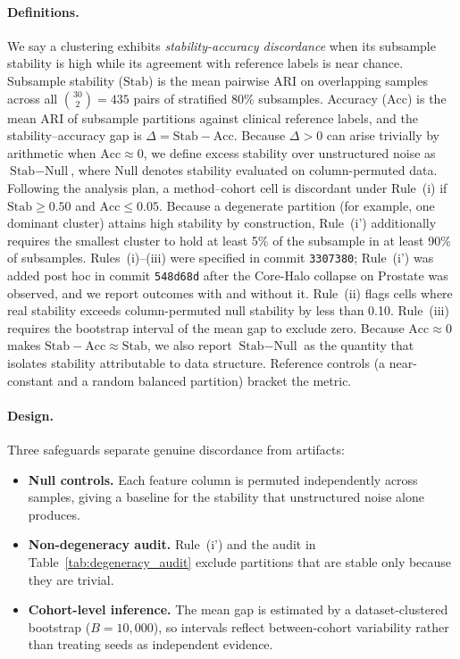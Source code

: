 \documentclass[pdflatex,sn-mathphys-num]{sn-jnl}
\theoremstyle{thmstyleone}
\theoremstyle{thmstyletwo}
\theoremstyle{thmstylethree}
\begin{document}
\paragraph{Definitions.}
We say a clustering exhibits \emph{stability-accuracy discordance} when its subsample stability is high while its agreement with reference labels is near chance. Subsample stability ($\text{Stab}$) is the mean pairwise ARI on overlapping samples across all $\binom{30}{2} = 435$ pairs of stratified 80\% subsamples. Accuracy ($\text{Acc}$) is the mean ARI of subsample partitions against clinical reference labels, and the stability--accuracy gap is $\Delta = \text{Stab} - \text{Acc}$. Because $\Delta > 0$ can arise trivially by arithmetic when $\text{Acc} \approx 0$, we define excess stability over unstructured noise as $\text{Stab} - \text{Null}$, where $\text{Null}$ denotes stability evaluated on column-permuted data. Following the analysis plan, a method--cohort cell is discordant under Rule~(i) if $\text{Stab} \ge 0.50$ and $\text{Acc} \le 0.05$. Because a degenerate partition (for example, one dominant cluster) attains high stability by construction, Rule~(i') additionally requires the smallest cluster to hold at least 5\% of the subsample in at least 90\% of subsamples. Rules~(i)--(iii) were specified in commit \texttt{3307380}; Rule~(i') was added post hoc in commit \texttt{548d68d} after the Core-Halo collapse on Prostate was observed, and we report outcomes with and without it. Rule~(ii) flags cells where real stability exceeds column-permuted null stability by less than 0.10. Rule~(iii) requires the bootstrap interval of the mean gap to exclude zero. Because $\text{Acc} \approx 0$ makes $\text{Stab} - \text{Acc} \approx \text{Stab}$, we also report $\text{Stab} - \text{Null}$ as the quantity that isolates stability attributable to data structure. Reference controls (a near-constant and a random balanced partition) bracket the metric.

\paragraph{Design.}
Three safeguards separate genuine discordance from artifacts:
\begin{itemize}
    \item \textbf{Null controls.} Each feature column is permuted independently across samples, giving a baseline for the stability that unstructured noise alone produces.
    \item \textbf{Non-degeneracy audit.} Rule~(i') and the audit in Table~\ref{tab:degeneracy_audit} exclude partitions that are stable only because they are trivial.
    \item \textbf{Cohort-level inference.} The mean gap is estimated by a dataset-clustered bootstrap ($B = 10{,}000$), so intervals reflect between-cohort variability rather than treating seeds as independent evidence.
\end{itemize}
\end{document}
